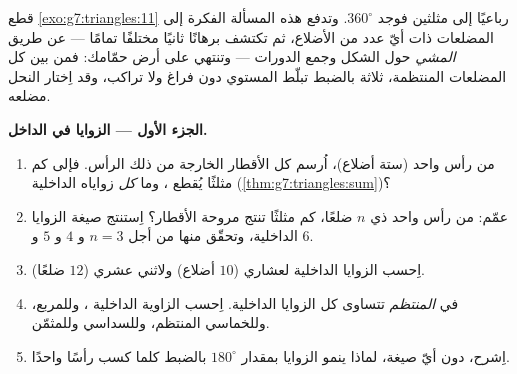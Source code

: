 \begin{problem}
\label{pb:g7:triangles:1}
قطع \cref{exo:g7:triangles:11} رباعيًا إلى مثلثين
فوجد $360^\circ$. وتدفع هذه المسألة الفكرة إلى المضلعات
ذات أيّ عدد من الأضلاع، ثم تكتشف برهانًا ثانيًا مختلفًا
تمامًا --- عن طريق \emph{المشي} حول الشكل وجمع
الدورات --- وتنتهي على أرض حمّامك: فمن بين كل
المضلعات المنتظمة، ثلاثة بالضبط تبلّط المستوي دون فراغ ولا
تراكب، وقد اِختار النحل مضلعه.

\medskip
\noindent\textbf{الجزء الأول --- الزوايا في الداخل.}
\begin{enumerate}
  \item من رأس واحد  (ستة أضلاع)، اُرسم كل
        الأقطار الخارجة من ذلك الرأس. فإلى كم مثلثًا يُقطع
        ، وما  \emph{كل} زواياه
        الداخلية (\cref{thm:g7:triangles:sum})؟
  \item عمّم: من رأس واحد  ذي $n$ ضلعًا،
        كم مثلثًا تنتج مروحة الأقطار؟
        اِستنتج صيغة  الزوايا الداخلية،
        وتحقّق منها من أجل $n = 3$ و $4$ و $5$ و $6$.
  \item اِحسب  الزوايا الداخلية لعشاري
        ($10$ أضلاع) ولاثني عشري ($12$ ضلعًا).
  \item في  \emph{المنتظم} تتساوى كل الزوايا
        الداخلية. اِحسب الزاوية الداخلية ، وللمربع، وللخماسي المنتظم، وللسداسي
        وللمثمّن.
  \item اِشرح، دون أيّ صيغة، لماذا ينمو  الزوايا بمقدار
        $180^\circ$ بالضبط كلما كسب  رأسًا
        واحدًا.
\end{enumerate}


\end{problem}
